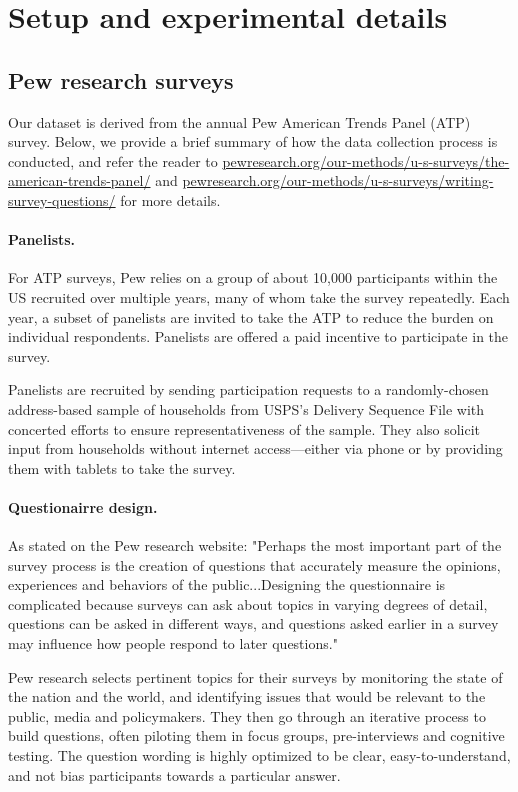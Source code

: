 \section{Setup and experimental details}

\subsection{Pew research surveys}
\label{app:pew_collection}

Our dataset is derived from the annual Pew American Trends Panel (ATP) survey.
Below, we provide a brief summary of how the data collection process is conducted, and refer the reader to \url{pewresearch.org/our-methods/u-s-surveys/the-american-trends-panel/} and \url{pewresearch.org/our-methods/u-s-surveys/writing-survey-questions/} for more details.


\paragraph{Panelists.}

For ATP surveys, Pew relies on a group of about 10,000 participants within the US recruited over multiple years, many of whom take the survey repeatedly.
Each year, a subset of panelists are invited to take the ATP to reduce the burden on individual respondents.
Panelists are offered a paid incentive to participate in the survey.

Panelists are recruited by sending participation requests to a randomly-chosen address-based sample of households from USPS's Delivery Sequence File with concerted efforts to ensure representativeness of the sample. 
They also solicit input from households without internet access---either via phone or by providing them with tablets to take the survey.

\paragraph{Questionairre design.}
As stated on the Pew research website: "Perhaps the most important part of the survey process is the creation of questions that accurately measure the opinions, experiences and behaviors of the public...Designing the questionnaire is complicated because surveys can ask about topics in varying degrees of detail, questions can be asked in different ways, and questions asked earlier in a survey may influence how people respond to later questions."

Pew research selects pertinent topics for their surveys by monitoring the state of the nation and the world, and identifying issues that would be relevant to the public, media and policymakers.
They then go through an iterative process to build questions, often piloting them in focus groups, pre-interviews and cognitive testing.
The question wording is highly optimized to be clear, easy-to-understand, and not bias participants towards a particular answer. 

